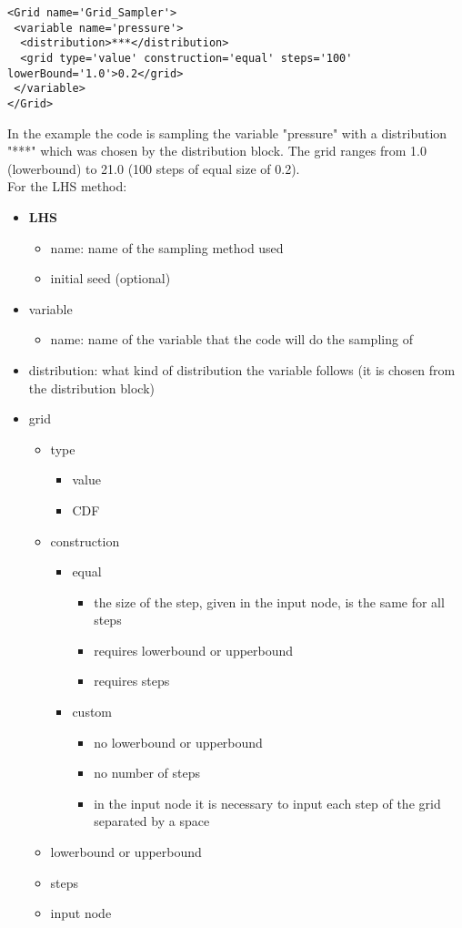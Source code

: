 \begin{lstlisting}[style=XML]
<Grid name='Grid_Sampler'> 
 <variable name='pressure'>  
  <distribution>***</distribution> 
  <grid	type='value' construction='equal' steps='100' lowerBound='1.0'>0.2</grid>   
 </variable> 
</Grid> 
\end{lstlisting}
In the example the code is sampling the variable "pressure" with a distribution "***" which was chosen by the distribution block. The grid ranges from 1.0 (lowerbound) to 21.0 (100 steps of equal size of 0.2).  
\\
For the LHS method:
\begin{itemize}
\item \textbf{LHS}
\begin{itemize}
\item name: name of the sampling method used
\item initial seed (optional)
\end{itemize}
\item variable
\begin{itemize}
\item name: name of the variable that the code will do the sampling of
\end{itemize}
\item distribution: what kind of distribution the variable follows (it is chosen from the distribution block) 
\item grid
\begin{itemize}
\item type
\begin{itemize}
\item value
\item CDF
\end{itemize}
\item construction 
\begin{itemize}
\item equal
\begin{itemize}
\item the size of the step, given in the input node, is the same for all steps
\item requires lowerbound or upperbound
\item requires steps
\end{itemize}
\item custom
\begin{itemize} 
\item no lowerbound or upperbound 
\item no number of steps
\item in the input node it is necessary to input each step of the grid separated by a space
\end{itemize}
\end{itemize}
\item lowerbound or upperbound
\item steps
\item input node
\end{itemize}
\end{itemize}

